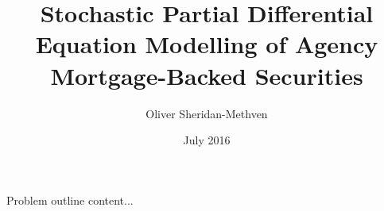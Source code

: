 \documentclass{beamer}
\title{Stochastic Partial Differential Equation Modelling of Agency Mortgage-Backed Securities}
\date{July 2016}
\author{Oliver Sheridan-Methven}
\begin{document}
\maketitle

\begin{frame}{Problem outline}
	content...
\end{frame}
\end{document}
